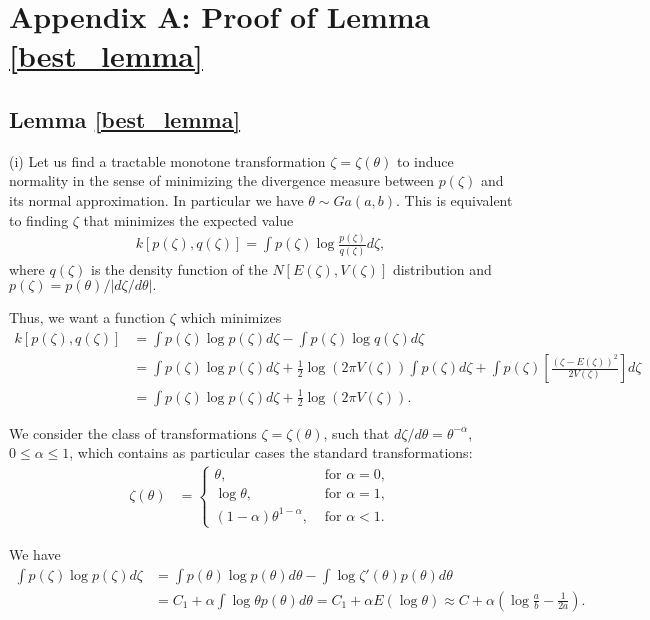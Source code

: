 \documentclass[12pt,a4paper]{article}\usepackage[]{graphicx}\usepackage[]{color}\usepackage{subfigure}
\begin{document}


\section*{Appendix A: Proof of Lemma \ref{best_lemma}}%

\subsection*{Lemma \ref{best_lemma}}
(i) Let us find a tractable monotone transformation $\zeta = \zeta(\theta)$ to induce normality in the sense of minimizing the divergence measure between $p(\zeta)$ and its normal approximation. In particular we have $\theta\sim Ga(a,b)$. This is equivalent to finding $\zeta$ that minimizes the expected 
value
\begin{align*}
k[p(\zeta),q(\zeta)] = \int{p(\zeta)\log{\frac{p(\zeta)}{q(\zeta)} d\zeta}}, 
\end{align*}
where $q(\zeta)$ is the density function of the $N[E(\zeta), V(\zeta)]$ distribution and $p(\zeta)=p(\theta)/|d\zeta/d\theta|.$ 

Thus, we want a function $\zeta$ which minimizes
\begin{align*}
k[p(\zeta),q(\zeta)] &= \int{p(\zeta)\log{p(\zeta)}d\zeta}-\int{p(\zeta)\log{q(\zeta)}d\zeta}\\
&= \int{p(\zeta)\log{p(\zeta)} d\zeta}+\frac{1}{2}\log(2\pi V(\zeta))\int{p(\zeta)d\zeta}+\int{p(\zeta)\left[\frac{(\zeta-E(\zeta))^2}{2V(\zeta)}\right]d\zeta}\\
&= \int{p(\zeta)\log{p(\zeta)} d\zeta}+\frac{1}{2}\log(2\pi V(\zeta)). 
\end{align*}

We consider the class of transformations $\zeta=\zeta(\theta)$, such that $d\zeta/d\theta=\theta^{-\alpha}$, $0\leq\alpha\leq 1$, which contains as 
particular cases 
the standard transformations:
\begin{align*}
\zeta (\theta) &=\left\{\begin{array}{lr} \theta, & \mbox{ for } \alpha = 0,\\
\log\theta, & \mbox{ for } \alpha = 1,\\
(1-\alpha)\theta^{1-\alpha}, &\mbox{ for } \alpha < 1.
\end{array}
\right.
\end{align*}

We have
\begin{align*}
\int{p(\zeta)\log{p(\zeta)} d\zeta} &%
= \int{p(\theta)\log{p(\theta)}d\theta}-\int{\log{\zeta'(\theta)}p(\theta)d\theta}\\
& = C_1 + \alpha\int{\log \theta p(\theta) d\theta} = C_1+ \alpha E(\log \theta) \approx C + \alpha\left(\log \frac{a}{b}-\frac{1}{2a}\right).
\end{align*}
\end{document}
